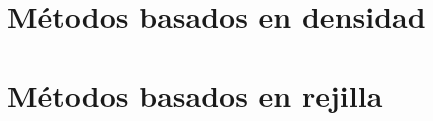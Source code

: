 \documentclass[3p,twocolumn]{elsarticle}
\begin{document}
\clearpage

\section{Métodos basados en densidad} \label{sec:Métodos basados en densidad}




\section{Métodos basados en rejilla} \label{sec:Métodos basados en rejilla}
\end{document}
